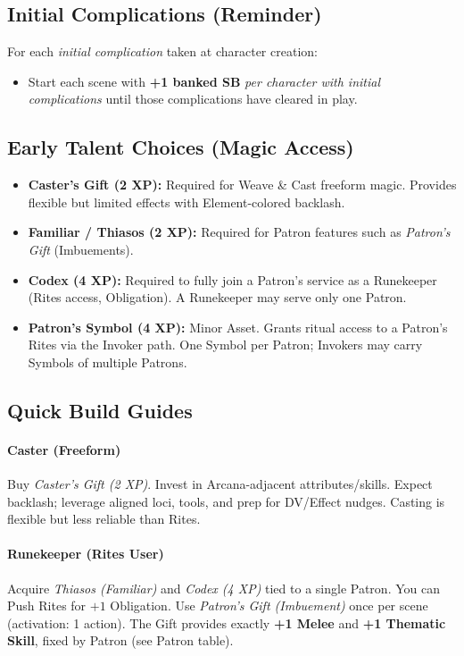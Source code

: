 \subsection{Initial Complications (Reminder)}
For each \emph{initial complication} taken at character creation:
\begin{itemize}
  \item Start each scene with \textbf{+1 banked SB} \emph{per character with initial complications} until those complications have cleared in play.
\end{itemize}

\subsection{Early Talent Choices (Magic Access)}
\begin{itemize}
  \item \textbf{Caster’s Gift (2 XP):} Required for Weave \& Cast freeform magic. Provides flexible but limited effects with Element-colored backlash.
  \item \textbf{Familiar / Thiasos (2 XP):} Required for Patron features such as \emph{Patron’s Gift} (Imbuements).
  \item \textbf{Codex (4 XP):} Required to fully join a Patron’s service as a Runekeeper (Rites access, Obligation). A Runekeeper may serve only one Patron.
  \item \textbf{Patron’s Symbol (4 XP):} Minor Asset. Grants ritual access to a Patron’s Rites via the Invoker path. One Symbol per Patron; Invokers may carry Symbols of multiple Patrons.
\end{itemize}

\subsection{Quick Build Guides}
\paragraph{Caster (Freeform)}
Buy \emph{Caster’s Gift (2 XP)}. Invest in Arcana-adjacent attributes/skills. Expect backlash; leverage aligned loci, tools, and prep for DV/Effect nudges. Casting is flexible but less reliable than Rites.

\paragraph{Runekeeper (Rites User)}
Acquire \emph{Thiasos (Familiar)} and \emph{Codex (4 XP)} tied to a single Patron. You can Push Rites for $+1$ Obligation. Use \emph{Patron’s Gift (Imbuement)} once per scene (activation: 1 action). The Gift provides exactly \textbf{+1 Melee} and \textbf{+1 Thematic Skill}, fixed by Patron (see Patron table).

